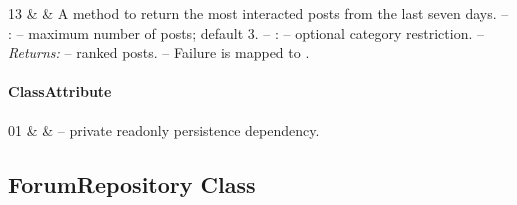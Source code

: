 \begin{ClassMethodTable}
13 & \newline{}\newline{} &
A method to return the most interacted posts from the last seven days.
\newline -- :  -- maximum number of posts; default 3.
\newline -- :  -- optional category restriction.
\newline -- \textit{Returns:}  -- ranked posts.
\newline -- Failure is mapped to . \\ \hline
\end{ClassMethodTable}

\paragraph{ClassAttribute}
\begin{ClassAttributeTable}
01 &  &  -- private readonly persistence dependency. \\ \hline
\end{ClassAttributeTable}

\subsection{ForumRepository Class}

